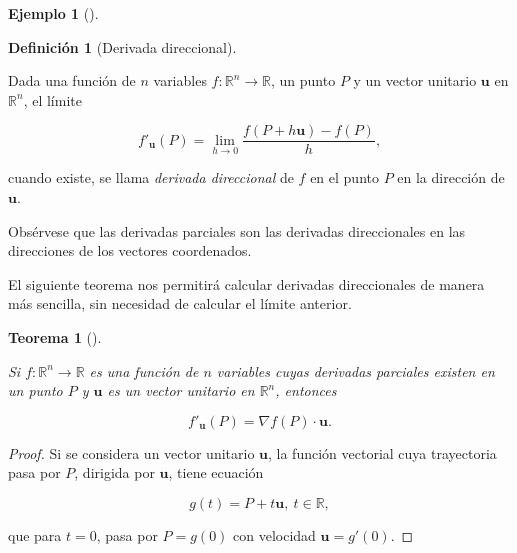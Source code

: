 \documentclass[
  a4paper,
]{scrreport}
\theoremstyle{definition}
\newtheorem{example}{Ejemplo}[chapter]
\theoremstyle{plain}
\theoremstyle{definition}
\newtheorem{definition}{Definición}[chapter]
\theoremstyle{definition}
\theoremstyle{plain}
\newtheorem{theorem}{Teorema}[chapter]
\theoremstyle{plain}
\theoremstyle{remark}
\begin{document}
\begin{example}[]
\begin{definition}[Derivada
direccional]\protect\hypertarget{def-derivada-direccional}{}\label{def-derivada-direccional}

Dada una función de \(n\) variables
\(f:\mathbb{R}^n\rightarrow \mathbb{R}\), un punto \(P\) y un vector
unitario \(\mathbf{u}\) en \(\mathbb{R}^n\), el límite

\[
f'_{\mathbf{u}}(P) = \lim_{h\rightarrow 0}\frac{f(P+h\mathbf{u})-f(P)}{h},
\]

cuando existe, se llama \emph{derivada direccional} de \(f\) en el punto
\(P\) en la dirección de \(\mathbf{u}\).

\end{definition}

Obsérvese que las derivadas parciales son las derivadas direccionales en
las direcciones de los vectores coordenados.

El siguiente teorema nos permitirá calcular derivadas direccionales de
manera más sencilla, sin necesidad de calcular el límite anterior.

\begin{theorem}[]\protect\hypertarget{thm-derivada-direccional}{}\label{thm-derivada-direccional}

Si \(f:\mathbb{R}^n\rightarrow \mathbb{R}\) es una función de \(n\)
variables cuyas derivadas parciales existen en un punto \(P\) y
\(\mathbf{u}\) es un vector unitario en \(\mathbb{R}^n\), entonces

\[
f'_{\mathbf{u}}(P) = \nabla f(P)\cdot \mathbf{u}.
\]

\end{theorem}

\begin{tcolorbox}[enhanced jigsaw, leftrule=.75mm, colbacktitle=quarto-callout-note-color!10!white, toprule=.15mm, opacityback=0, opacitybacktitle=0.6, toptitle=1mm, breakable, bottomtitle=1mm, colframe=quarto-callout-note-color-frame, rightrule=.15mm, titlerule=0mm, title=\textcolor{quarto-callout-note-color}{\faInfo}\hspace{0.5em}{Demostración}, arc=.35mm, left=2mm, bottomrule=.15mm, colback=white, coltitle=black]

\begin{proof}
Si se considera un vector unitario \(\mathbf{u}\), la función vectorial
cuya trayectoria pasa por \(P\), dirigida por \(\mathbf{u}\), tiene
ecuación

\[
g(t)=P+t\mathbf{u},\ t\in\mathbb{R},
\]

que para \(t=0\), pasa por \(P=g(0)\) con velocidad
\(\mathbf{u}=g'(0)\).


\end{proof}
\end{tcolorbox}
\end{example}
\end{document}
